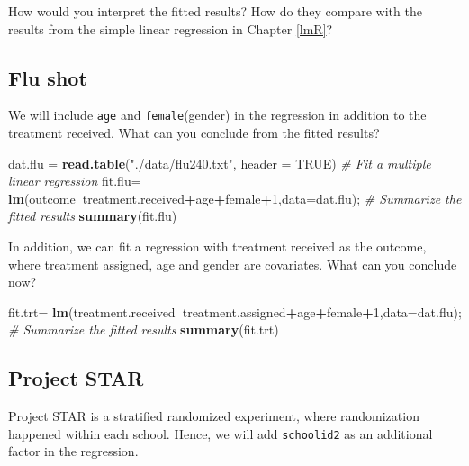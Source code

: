 \documentclass[12pt,]{book}
\newenvironment{Shaded}{\begin{snugshade}}{\end{snugshade}}
\newcommand{\KeywordTok}[1]{\textcolor[rgb]{0.13,0.29,0.53}{\textbf{#1}}}
\newcommand{\DataTypeTok}[1]{\textcolor[rgb]{0.13,0.29,0.53}{#1}}
\newcommand{\DecValTok}[1]{\textcolor[rgb]{0.00,0.00,0.81}{#1}}
\newcommand{\StringTok}[1]{\textcolor[rgb]{0.31,0.60,0.02}{#1}}
\newcommand{\CommentTok}[1]{\textcolor[rgb]{0.56,0.35,0.01}{\textit{#1}}}
\newcommand{\OtherTok}[1]{\textcolor[rgb]{0.56,0.35,0.01}{#1}}
\newcommand{\OperatorTok}[1]{\textcolor[rgb]{0.81,0.36,0.00}{\textbf{#1}}}
\newcommand{\NormalTok}[1]{#1}
\begin{document}
How would you interpret the fitted results? How do they compare with the
results from the simple linear regression in Chapter \ref{lmR}?

\subsection{Flu shot}\label{flu-shot-1}

We will include \texttt{age} and \texttt{female}(gender) in the
regression in addition to the treatment received. What can you conclude
from the fitted results?

\begin{Shaded}
\begin{Highlighting}[]
\NormalTok{dat.flu =}\StringTok{ }\KeywordTok{read.table}\NormalTok{(}\StringTok{"./data/flu240.txt"}\NormalTok{, }\DataTypeTok{header =} \OtherTok{TRUE}\NormalTok{)}
\CommentTok{# Fit a multiple linear regression}
\NormalTok{fit.flu=}\StringTok{ }\KeywordTok{lm}\NormalTok{(outcome}\OperatorTok{~}\NormalTok{treatment.received}\OperatorTok{+}\NormalTok{age}\OperatorTok{+}\NormalTok{female}\OperatorTok{+}\DecValTok{1}\NormalTok{,}\DataTypeTok{data=}\NormalTok{dat.flu); }
\CommentTok{# Summarize the fitted results}
\KeywordTok{summary}\NormalTok{(fit.flu) }
\end{Highlighting}
\end{Shaded}

In addition, we can fit a regression with treatment received as the
outcome, where treatment assigned, age and gender are covariates. What
can you conclude now?

\begin{Shaded}
\begin{Highlighting}[]
\NormalTok{fit.trt=}\StringTok{ }\KeywordTok{lm}\NormalTok{(treatment.received}\OperatorTok{~}\NormalTok{treatment.assigned}\OperatorTok{+}\NormalTok{age}\OperatorTok{+}\NormalTok{female}\OperatorTok{+}\DecValTok{1}\NormalTok{,}\DataTypeTok{data=}\NormalTok{dat.flu); }
\CommentTok{# Summarize the fitted results}
\KeywordTok{summary}\NormalTok{(fit.trt) }
\end{Highlighting}
\end{Shaded}

\subsection{Project STAR}\label{project-star-1}

Project STAR is a stratified randomized experiment, where randomization
happened within each school. Hence, we will add \texttt{schoolid2} as an
additional factor in the regression.
\end{document}
